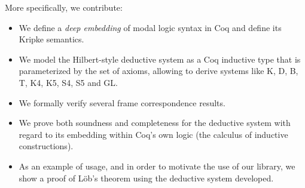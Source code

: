\documentclass[3p,times]{elsarticle}
\begin{document}


More specifically, we contribute:

\begin{itemize}
  \item We define a \emph{deep embedding} of modal logic syntax in Coq and
    define its Kripke semantics.
  \item We model the Hilbert-style deductive system as a Coq inductive type that is
    parameterized by the set of axioms, allowing to derive systems like K, D, B, T, K4, K5, S4, S5 and GL.
  \item We formally verify several frame correspondence results.
  \item We prove both soundness and completeness for the deductive system with regard to its embedding within Coq's own logic (the calculus of inductive constructions).

  \item As an example of usage, and in order to motivate the use of our library, we show a proof of L\"ob's theorem using the deductive system
    developed.
\end{itemize}
\end{document}
